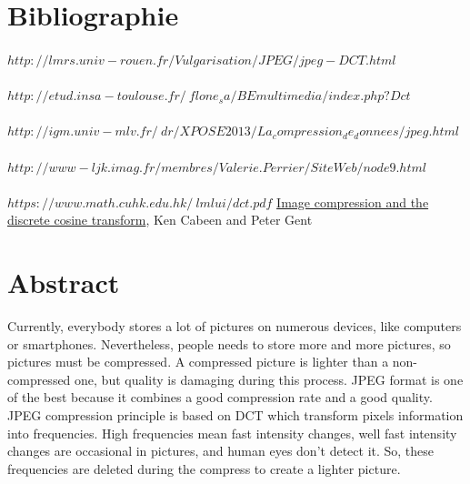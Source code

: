 \documentclass[12pt]{article}
\begin{document}
\section{Bibliographie}
\paragraph{}
$http://lmrs.univ-rouen.fr/Vulgarisation/JPEG/jpeg-DCT.html$
\paragraph{}
$http://etud.insa-toulouse.fr/~flone_sa/BEmultimedia/index.php?Dct$
\paragraph{}
$http://igm.univ-mlv.fr/~dr/XPOSE2013/La_compression_de_donnees/jpeg.html$
\paragraph{}
$http://www-ljk.imag.fr/membres/Valerie.Perrier/SiteWeb/node9.html$
\paragraph{}
$https://www.math.cuhk.edu.hk/~lmlui/dct.pdf$
\newline
\underline{Image compression and the discrete cosine transform}, Ken Cabeen and Peter Gent

\newpage
\section{Abstract}
Currently, everybody stores a lot of pictures on numerous devices, like computers or smartphones. Nevertheless, people needs to store more and more pictures, so pictures must be compressed. A compressed picture is lighter than a non-compressed one, but quality is damaging during this process. JPEG format is one of the best because it combines a good compression rate and a good quality. JPEG compression principle is based on DCT which transform pixels information into frequencies. High frequencies mean fast intensity changes, well fast intensity changes are occasional in pictures, and human eyes don’t detect it. So, these frequencies are deleted during the compress to create a lighter picture.
\end{document}

